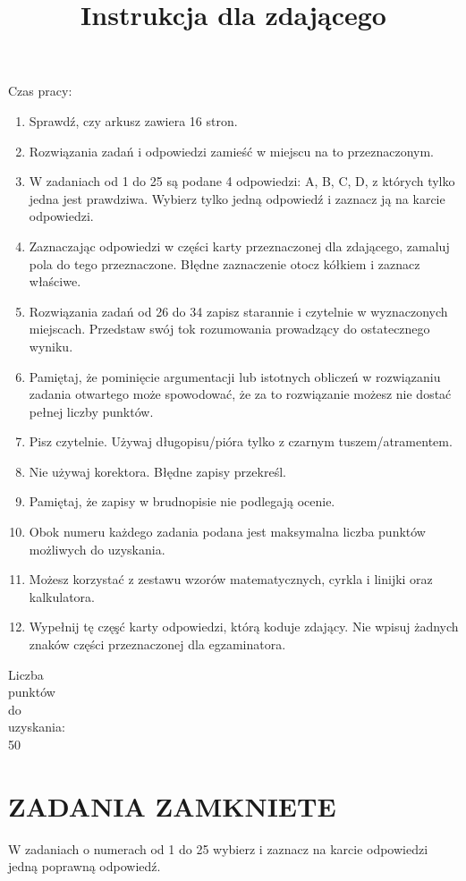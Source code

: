 \documentclass[10pt]{article}
\title{Instrukcja dla zdającego }
\author{}
\date{}
\begin{document}
\maketitle
Czas pracy:

\begin{enumerate}
  \item Sprawdź, czy arkusz zawiera 16 stron.
  \item Rozwiązania zadań i odpowiedzi zamieść w miejscu na to przeznaczonym.
  \item W zadaniach od 1 do 25 są podane 4 odpowiedzi: A, B, C, D, z których tylko jedna jest prawdziwa. Wybierz tylko jedną odpowiedź i zaznacz ją na karcie odpowiedzi.
  \item Zaznaczając odpowiedzi w części karty przeznaczonej dla zdającego, zamaluj pola do tego przeznaczone. Błędne zaznaczenie otocz kółkiem i zaznacz właściwe.
  \item Rozwiązania zadań od 26 do 34 zapisz starannie i czytelnie w wyznaczonych miejscach. Przedstaw swój tok rozumowania prowadzący do ostatecznego wyniku.
  \item Pamiętaj, że pominięcie argumentacji lub istotnych obliczeń w rozwiązaniu zadania otwartego może spowodować, że za to rozwiązanie możesz nie dostać pełnej liczby punktów.
  \item Pisz czytelnie. Używaj długopisu/pióra tylko z czarnym tuszem/atramentem.
  \item Nie używaj korektora. Błędne zapisy przekreśl.
  \item Pamiętaj, że zapisy w brudnopisie nie podlegają ocenie.
  \item Obok numeru każdego zadania podana jest maksymalna liczba punktów możliwych do uzyskania.
  \item Możesz korzystać z zestawu wzorów matematycznych, cyrkla i linijki oraz kalkulatora.
  \item Wypełnij tę częşć karty odpowiedzi, którą koduje zdający. Nie wpisuj żadnych znaków części przeznaczonej dla egzaminatora.
\end{enumerate}

Liczba\\
punktów\\
do\\
uzyskania:\\
50

\section*{ZADANIA ZAMKNIETE}
W zadaniach o numerach od 1 do 25 wybierz i zaznacz na karcie odpowiedzi jedną poprawną odpowiedź.
\end{document}
